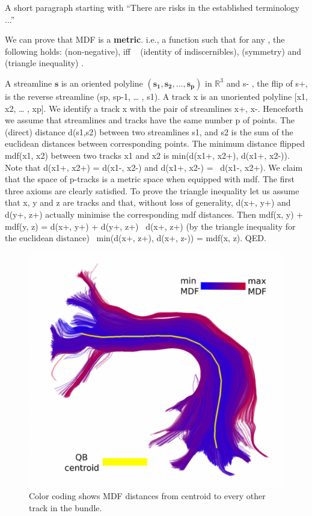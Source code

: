 \documentclass{bioinfo}
\begin{document}
\begin{methods}
A short paragraph starting with “There are risks in the established
terminology ...”  

We can prove that MDF is a \textbf{metric}. i.e., a function such that for any , the following holds:
(non-negative), iff   (identity of indiscernibles), (symmetry) and
(triangle inequality) .  

A streamline $\mathbf{s}$ is an oriented polyline $\mathbf{(s_1, s_2,
  \ldots, s_p)}$ in $\mathbb{R}^3$ and s- , the flip of s+, is the
reverse streamline (sp, sp-1, … , s1). A track x is an unoriented
polyline [x1, x2, … , xp]. We identify a track x with the pair of
streamlines {x+, x-}. Henceforth we assume that streamlines and tracks
have the same number p of points. The (direct) distance d(s1,s2) between
two streamlines s1, and s2 is the sum of the euclidean distances between
corresponding points. The minimum distance flipped mdf(x1, x2) between
two tracks x1 and x2 is min(d(x1+, x2+), d(x1+, x2-)). Note that d(x1+,
x2+) = d(x1-, x2-) and d(x1+, x2-) =  d(x1-, x2+).  We claim that the
space of p-tracks is a metric space when equipped with mdf. The first
three axioms are clearly satisfied. To prove the triangle inequality let
us assume that x, y and z are tracks and that, without loss of
generality, d(x+, y+) and d(y+, z+) actually minimise the corresponding
mdf distances. Then mdf(x, y) + mdf(y, z) = d(x+, y+) + d(y+, z+)  d(x+,
z+) (by the triangle inequality for the euclidean distance)  min(d(x+,
z+), d(x+, z-)) = mdf(x, z). QED.

\begin{figure}
\includegraphics[scale=0.15]{Figures/Fig_11_MDF_arcuate}
\centering{}
\caption{Color coding shows MDF distances from centroid to every other track in the bundle.\label{Flo:MDF_arcuate}}
\end{figure}


\end{methods}
\end{document}
